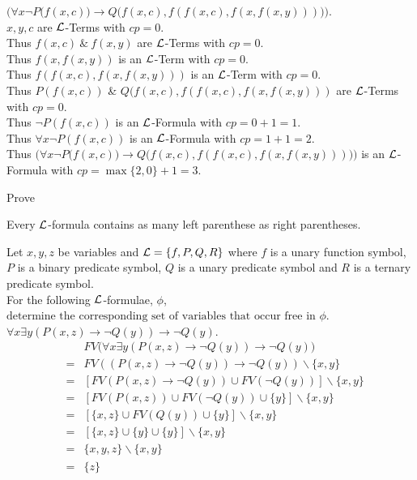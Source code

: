 \documentclass[11pt,a4paper]{article}
\begin{document}
\qpartnb $\big(\forall x\neg P\big(f(x,c)\big)\to Q\big(f(x,c),f(f(x,c),f(x,f(x,y)))\big)\big)$.\\

\apart
$x,y,c$ are $\mathcal{L}$-Terms with $cp=0$.\\
Thus $f(x,c)\ \&\ f(x,y)$ are $\mathcal{L}$-Terms with $cp=0$.\\
Thus $f(x,f(x,y))$ is an $\mathcal{L}$-Term with $cp=0$.\\
Thus $f(f(x,c),f(x,f(x,y)))$ is an $\mathcal{L}$-Term with $cp=0$.\\
Thus $P(f(x,c))$ \& $Q\big(f(x,c),f(f(x,c),f(x,f(x,y)))$ are $\mathcal{L}$-Terms with $cp=0$.\\
Thus $\neg P(f(x,c))$ is an $\mathcal{L}$-Formula with $cp=0+1=1$.\\
Thus $\forall x\neg P(f(x,c))$ is an $\mathcal{L}$-Formula with $cp=1+1=2$.\\
Thus $\big(\forall x\neg P\big(f(x,c)\big)\to Q\big(f(x,c),f(f(x,c),f(x,f(x,y)))\big)\big)$ is an $\mathcal{L}$-Formula with ${cp=\max\{2,0\}+1=3}$.

\question
Prove
\begin{center}
Every $\mathcal{L}$-formula contains as many left parenthese as right parentheses.
\end{center}

\ans

\question
Let $x,y,z$ be variables and $\mathcal{L}=\{f,P,Q,R\}$ where $f$ is a unary function symbol, $P$ is a binary predicate symbol, $Q$ is a unary predicate symbol and $R$ is a ternary predicate symbol.\\
For the following $\mathcal{L}$-formulae, $\phi$, $\text{determine the corresponding set of variables that occur free in }\phi$.\\

\qpartnb $\forall x\exists y (P(x,z)\to\neg Q(y))\to\neg Q(y)$.\\

\apartnb
\[\begin{array}{rcl}
&&FV\big(\forall x\exists y (P(x,z)\to\neg Q(y))\to\neg Q(y)\big)\\
&=&FV((P(x,z)\to\neg Q(y))\to\neg Q(y))\backslash\{x,y\}\\
&=&[FV(P(x,z)\to\neg Q(y))\cup FV(\neg Q(y))]\backslash\{x,y\}\\
&=&[FV(P(x,z))\cup FV(\neg Q(y))\cup \{y\}]\backslash\{x,y\}\\
&=&[\{x,z\}\cup FV(Q(y))\cup \{y\}]\backslash\{x,y\}\\
&=&[\{x,z\}\cup\{y\}\cup \{y\}]\backslash\{x,y\}\\
&=&\{x,y,z\}\backslash\{x,y\}\\
&=&\{z\}
\end{array}\]
\end{document}
